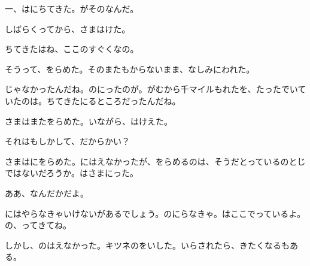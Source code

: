 一、はにちてきた。がそのなんだ。

しばらくってから、さまはけた。

ちてきたはね、ここのすぐくなの。

そうって、をらめた。そのまたもからないまま、なしみにわれた。

じゃなかったんだね。のにったのが。がむから千マイルもれたを、たったでいていたのは。ちてきたにるところだったんだね。

さまはまたをらめた。いながら、はけえた。

それはもしかして、だからかい？

さまはにをらめた。にはえなかったが、をらめるのは、そうだとっているのとじではないだろうか。はさまにった。

ああ、なんだかだよ。

にはやらなきゃいけないがあるでしょう。のにらなきゃ。はここでっているよ。の、ってきてね。

しかし、のはえなかった。キツネのをいした。いらされたら、きたくなるもある。



